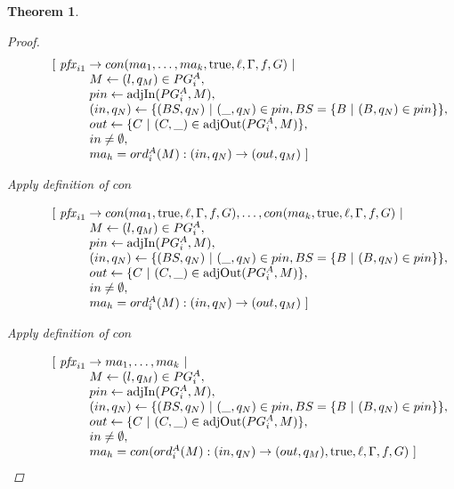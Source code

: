 \documentclass[twocolumn, openany]{sig-alternate-10pt}
\newtheorem{thm}{Theorem}
\begin{document}
\begin{thm}
\begin{proof}
  \[ \begin{array}{l}
     ~~~~~~~~~ [~ \mathit{pfx}_{i1} \rightarrow con(ma_1, \dots, ma_k,\text{true},\ell,\Gamma,f,G) ~\vert~ \\
     ~~~~~~~~~~~~~~~~~~ M \leftarrow (l,q_M) \in PG^A_i, \\
     ~~~~~~~~~~~~~~~~~~ pin \leftarrow \text{adjIn}(PG^A_i,M), \\
     ~~~~~~~~~~~~~~~~~~ (in,q_N) \leftarrow \{ (BS,q_N) ~\vert~ (\_,q_N) \in pin, BS=\{B ~\vert~ (B,q_N) \in pin \} \}, \\
     ~~~~~~~~~~~~~~~~~~ out \leftarrow \{ C ~\vert~ (C,\_) \in \text{adjOut}(PG^A_i,M) \}, \\
     ~~~~~~~~~~~~~~~~~~ in \neq \emptyset, \\
     ~~~~~~~~~~~~~~~~~~ ma_h = ord^A_i(M) : (in,q_N) \rightarrow (out,q_M) ~] \\
  \end{array} \]%

  Apply definition of $con$

  \[ \begin{array}{l}
     ~~~~~~~~~ [~ \mathit{pfx}_{i1} \rightarrow con(ma_1,\text{true},\ell,\Gamma,f,G), \dots, con(ma_k,\text{true},\ell,\Gamma,f,G) ~\vert~ \\
     ~~~~~~~~~~~~~~~~~~ M \leftarrow (l,q_M) \in PG^A_i, \\
     ~~~~~~~~~~~~~~~~~~ pin \leftarrow \text{adjIn}(PG^A_i,M), \\
     ~~~~~~~~~~~~~~~~~~ (in,q_N) \leftarrow \{ (BS,q_N) ~\vert~ (\_,q_N) \in pin, BS=\{B ~\vert~ (B,q_N) \in pin \} \}, \\
     ~~~~~~~~~~~~~~~~~~ out \leftarrow \{ C ~\vert~ (C,\_) \in \text{adjOut}(PG^A_i,M) \}, \\
     ~~~~~~~~~~~~~~~~~~ in \neq \emptyset, \\
     ~~~~~~~~~~~~~~~~~~ ma_h = ord^A_i(M) : (in,q_N) \rightarrow (out,q_M) ~] \\
  \end{array} \]%

  Apply definition of $con$

  \[ \begin{array}{l}
     ~~~~~~~~~ [~ \mathit{pfx}_{i1} \rightarrow ma_1, \dots, ma_k ~\vert~ \\
     ~~~~~~~~~~~~~~~~~~ M \leftarrow (l,q_M) \in PG^A_i, \\
     ~~~~~~~~~~~~~~~~~~ pin \leftarrow \text{adjIn}(PG^A_i,M), \\
     ~~~~~~~~~~~~~~~~~~ (in,q_N) \leftarrow \{ (BS,q_N) ~\vert~ (\_,q_N) \in pin, BS=\{B ~\vert~ (B,q_N) \in pin \} \}, \\
     ~~~~~~~~~~~~~~~~~~ out \leftarrow \{ C ~\vert~ (C,\_) \in \text{adjOut}(PG^A_i,M) \}, \\
     ~~~~~~~~~~~~~~~~~~ in \neq \emptyset, \\
     ~~~~~~~~~~~~~~~~~~ ma_h = con(ord^A_i(M) : (in,q_N) \rightarrow (out,q_M),\text{true},\ell,\Gamma,f,G) ~] \\
  \end{array} \]%


\end{proof}
\end{thm}
\end{document}
